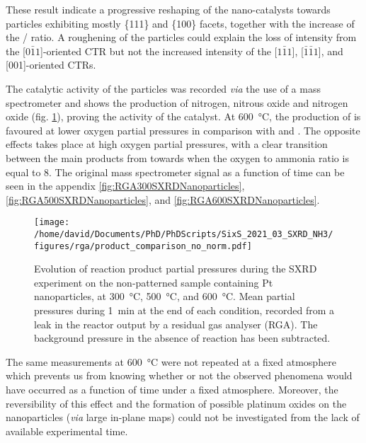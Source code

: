 These result indicate a progressive reshaping of the nano-catalysts towards particles exhibiting mostly \{111\} and \{100\} facets, together with the increase of the / ratio.
A roughening of the particles could explain the loss of intensity from the [$0\bar{1}1$]-oriented CTR but not the increased intensity of the [$1\bar{1}1$], [$\bar{1}\bar{1}1$], and [001]-oriented CTRs.

The catalytic activity of the particles was recorded \textit{via} the use of a mass spectrometer and shows the production of nitrogen, nitrous oxide and nitrogen oxide (fig. \ref{fig:RGASXRDNanoparticlesComparison}), proving the activity of the catalyst.
At \qty{600}{\degreeCelsius}, the production of  is favoured at lower oxygen partial pressures in comparison with  and .
The opposite effects takes place at high oxygen partial pressures, with a clear transition between the main products from  towards  when the oxygen to ammonia ratio is equal to 8.
The original mass spectrometer signal as a function of time can be seen in the appendix \ref{fig:RGA300SXRDNanoparticles}, \ref{fig:RGA500SXRDNanoparticles}, and \ref{fig:RGA600SXRDNanoparticles}.

\begin{figure}[!htb]
    \centering
    \texttt{[image: /home/david/Documents/PhD/PhDScripts/SixS\_2021\_03\_SXRD\_NH3/figures/rga/product\_comparison\_no\_norm.pdf]}
    \caption{
        Evolution of reaction product partial pressures during the SXRD experiment on the non-patterned sample containing Pt nanoparticles, at \qty{300}{\degreeCelsius}, \qty{500}{\degreeCelsius}, and \qty{600}{\degreeCelsius}.
        Mean partial pressures during \qty{1}{\minute} at the end of each condition, recorded from a leak in the reactor output by a residual gas analyser (RGA).
        The background pressure in the absence of reaction has been subtracted.
    }
    \label{fig:RGASXRDNanoparticlesComparison}
\end{figure}

The same measurements at \qty{600}{\degreeCelsius} were not repeated at a fixed atmosphere which prevents us from knowing whether or not the observed phenomena would have occurred as a function of time under a fixed atmosphere.
Moreover, the reversibility of this effect and the formation of possible platinum oxides on the nanoparticles (\textit{via} large in-plane maps) could not be investigated from the lack of available experimental time.

